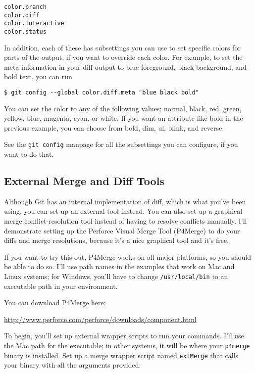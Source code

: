 \documentclass[a4paper]{book}
\newcounter{tab}[chapter]
\begin{document}
\begin{shaded}\begin{verbatim}
color.branch
color.diff
color.interactive
color.status
\end{verbatim}\end{shaded}

In addition, each of these has subsettings you can use to set specific colors for parts of the output, if you want to override each color. For example, to set the meta information in your diff output to blue foreground, black background, and bold text, you can run

\begin{shaded}\begin{verbatim}
$ git config --global color.diff.meta "blue black bold"
\end{verbatim}\end{shaded}

You can set the color to any of the following values: normal, black, red, green, yellow, blue, magenta, cyan, or white. If you want an attribute like bold in the previous example, you can choose from bold, dim, ul, blink, and reverse.

See the \texttt{git config} manpage for all the subsettings you can configure, if you want to do that.

\subsection{External Merge and Diff Tools}

Although Git has an internal implementation of diff, which is what you've been using, you can set up an external tool instead. You can also set up a graphical merge conflict-resolution tool instead of having to resolve conflicts manually. I'll demonstrate setting up the Perforce Visual Merge Tool (P4Merge) to do your diffs and merge resolutions, because it's a nice graphical tool and it's free.

If you want to try this out, P4Merge works on all major platforms, so you should be able to do so. I'll use path names in the examples that work on Mac and Linux systems; for Windows, you'll have to change \texttt{/usr/local/bin} to an executable path in your environment.

You can download P4Merge here:

\url{http://www.perforce.com/perforce/downloads/component.html}

To begin, you'll set up external wrapper scripts to run your commands. I'll use the Mac path for the executable; in other systems, it will be where your \texttt{p4merge} binary is installed. Set up a merge wrapper script named \texttt{extMerge} that calls your binary with all the arguments provided:
\end{document}
